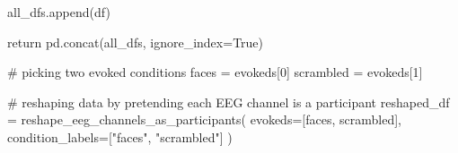 \documentclass[
  doc,
  floatsintext,
  longtable,
  a4paper,
  nolmodern,
  notxfonts,
  notimes,
  colorlinks=true,linkcolor=blue,citecolor=blue,urlcolor=blue]{apa7}
\newenvironment{Shaded}{\begin{snugshade}}{\end{snugshade}}
\newcommand{\CommentTok}[1]{\textcolor[rgb]{0.37,0.37,0.37}{#1}}
\newcommand{\ControlFlowTok}[1]{\textcolor[rgb]{0.00,0.23,0.31}{#1}}
\newcommand{\DecValTok}[1]{\textcolor[rgb]{0.68,0.00,0.00}{#1}}
\newcommand{\NormalTok}[1]{\textcolor[rgb]{0.00,0.23,0.31}{#1}}
\newcommand{\OperatorTok}[1]{\textcolor[rgb]{0.37,0.37,0.37}{#1}}
\newcommand{\StringTok}[1]{\textcolor[rgb]{0.13,0.47,0.30}{#1}}
\newcommand{\VariableTok}[1]{\textcolor[rgb]{0.07,0.07,0.07}{#1}}
\begin{document}
\begin{Shaded}
\begin{Highlighting}[]
\NormalTok{        all\_dfs.append(df)}

    \ControlFlowTok{return}\NormalTok{ pd.concat(all\_dfs, ignore\_index}\OperatorTok{=}\VariableTok{True}\NormalTok{)}

\CommentTok{\# picking two evoked conditions}
\NormalTok{faces }\OperatorTok{=}\NormalTok{ evokeds[}\DecValTok{0}\NormalTok{]}
\NormalTok{scrambled }\OperatorTok{=}\NormalTok{ evokeds[}\DecValTok{1}\NormalTok{]}

\CommentTok{\# reshaping data by pretending each EEG channel is a participant}
\NormalTok{reshaped\_df }\OperatorTok{=}\NormalTok{ reshape\_eeg\_channels\_as\_participants(}
\NormalTok{    evokeds}\OperatorTok{=}\NormalTok{[faces, scrambled],}
\NormalTok{    condition\_labels}\OperatorTok{=}\NormalTok{[}\StringTok{"faces"}\NormalTok{, }\StringTok{"scrambled"}\NormalTok{]}
\NormalTok{    )}
\end{Highlighting}
\end{Shaded}
\end{document}
